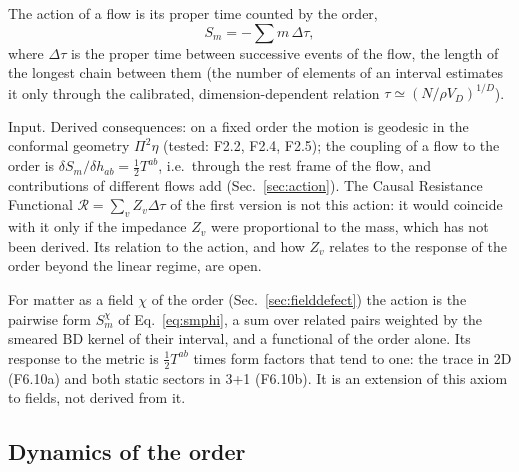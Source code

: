 \begin{axiom}\label{ax:action}
The action of a flow is its proper time counted by the order,
\begin{equation}
  S_m=-\sum m\,\Delta\tau ,
\end{equation}
where $\Delta\tau$ is the proper time between successive events of the flow, the length of the longest
chain between them (the number of elements of an interval estimates it only through the calibrated,
dimension-dependent relation $\tau\simeq(N/\rho V_D)^{1/D}$).
\end{axiom}
\begin{status} Input. Derived consequences: on a fixed order the motion is geodesic in the conformal
geometry $\Pi^2\eta$ (tested: F2.2, F2.4, F2.5); the coupling of a flow to the order is
$\delta S_m/\delta h_{ab}=\tfrac12T^{ab}$, i.e.\ through the rest frame of the flow, and contributions
of different flows add (Sec.~\ref{sec:action}). The Causal Resistance Functional
$\mathcal R=\sum_v Z_v\Delta\tau$ of the first version is not this action: it would coincide with it only if the
impedance $Z_v$ were proportional to the mass, which has not been derived. Its relation to the action, and how
$Z_v$ relates to the response of the order beyond the linear regime, are open.

For matter as a field $\chi$ of the order (Sec.~\ref{sec:fielddefect}) the action is the pairwise form
$S_m^\chi$ of Eq.~\eqref{eq:smphi}, a sum over related pairs weighted by the smeared BD kernel of their interval,
and a functional of the order alone. Its response to the metric is $\tfrac12T^{ab}$ times form factors that tend to
one: the trace in 2D (F6.10a) and both static sectors in 3+1 (F6.10b). It is an extension of this axiom to
fields, not derived from it. \end{status}

\subsection{Dynamics of the order}

